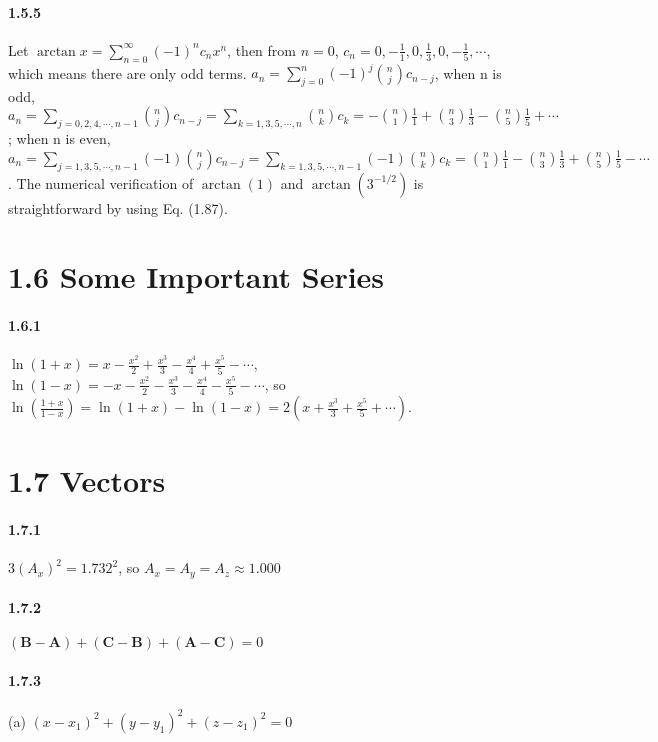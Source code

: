 \documentclass[a4paper]{article}
\begin{document}
\paragraph{1.5.5}
Let $\arctan{x}=\sum_{n=0}^\infty(-1)^n c_n x^n$, then from $n=0$, $c_n=0, -\frac{1}{1}, 0, \frac{1}{3}, 0, -\frac{1}{5}, \cdots$, which means there are only odd terms. $a_n=\sum_{j=0}^n(-1)^j\binom{n}{j}c_{n-j}$, when n is odd, $a_n=\sum_{j=0,2,4,\cdots,n-1}\binom{n}{j}c_{n-j}=\sum_{k=1,3,5,\cdots,n}\binom{n}{k}c_k=-\binom{n}{1}\frac{1}{1}+\binom{n}{3}\frac{1}{3}-\binom{n}{5}\frac{1}{5}+\cdots$; when n is even, $a_n=\sum_{j=1,3,5,\cdots,n-1}(-1)\binom{n}{j}c_{n-j}=\sum_{k=1,3,5,\cdots,n-1}(-1)\binom{n}{k}c_k=\binom{n}{1}\frac{1}{1}-\binom{n}{3}\frac{1}{3}+\binom{n}{5}\frac{1}{5}-\cdots$. The numerical verification of $\arctan{(1)}$ and $\arctan{(3^{-1/2})}$ is straightforward by using Eq. (1.87).

\section*{1.6 Some Important Series}
\paragraph{1.6.1}
$\ln{(1+x)}=x-\frac{x^2}{2}+\frac{x^3}{3}-\frac{x^4}{4}+\frac{x^5}{5}-\cdots$, $\ln{(1-x)}=-x-\frac{x^2}{2}-\frac{x^3}{3}-\frac{x^4}{4}-\frac{x^5}{5}-\cdots$, so $\ln{\left(\frac{1+x}{1-x} \right)}=\ln{(1+x)}-\ln{(1-x)}=2\left(x+\frac{x^3}{3}+\frac{x^5}{5}+\cdots \right)$.

\section*{1.7 Vectors}

\paragraph{1.7.1}
$3(A_x)^2=1.732^2$, so $A_x=A_y=A_z\approx1.000$

\paragraph{1.7.2}
$(\textbf{B}-\textbf{A})+(\textbf{C}-\textbf{B})+(\textbf{A}-\textbf{C})=0$

\paragraph{1.7.3}
(a) $(x-x_1)^2+(y-y_1)^2+(z-z_1)^2=0$
\end{document}

